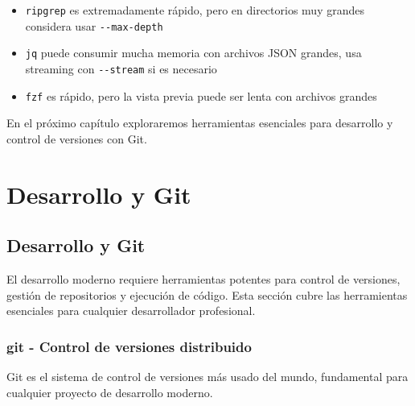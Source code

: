 \documentclass[
  11pt,
  letterpaper,
  oneside,
  openany]{scrbook}
\providecommand{\tightlist}{%
  \setlength{\itemsep}{0pt}\setlength{\parskip}{0pt}}
\begin{document}
\begin{tcolorbox}[enhanced jigsaw, coltitle=black, breakable, arc=.35mm, toprule=.15mm, colbacktitle=quarto-callout-important-color!10!white, colframe=quarto-callout-important-color-frame, opacityback=0, colback=white, bottomtitle=1mm, bottomrule=.15mm, rightrule=.15mm, left=2mm, toptitle=1mm, leftrule=.75mm, title=\textcolor{quarto-callout-important-color}{\faExclamation}\hspace{0.5em}{Rendimiento}, titlerule=0mm, opacitybacktitle=0.6]

\begin{itemize}
\tightlist
\item
  \texttt{ripgrep} es extremadamente rápido, pero en directorios muy
  grandes considera usar \texttt{-\/-max-depth}
\item
  \texttt{jq} puede consumir mucha memoria con archivos JSON grandes,
  usa streaming con \texttt{-\/-stream} si es necesario
\item
  \texttt{fzf} es rápido, pero la vista previa puede ser lenta con
  archivos grandes
\end{itemize}

\end{tcolorbox}

En el próximo capítulo exploraremos herramientas esenciales para
desarrollo y control de versiones con Git.

\part{Desarrollo y Git}

\chapter{Desarrollo y Git}\label{desarrollo-y-git-2}

El desarrollo moderno requiere herramientas potentes para control de
versiones, gestión de repositorios y ejecución de código. Esta sección
cubre las herramientas esenciales para cualquier desarrollador
profesional.

\section{git - Control de versiones distribuido}\label{sec-git}

Git es el sistema de control de versiones más usado del mundo,
fundamental para cualquier proyecto de desarrollo moderno.
\end{document}
